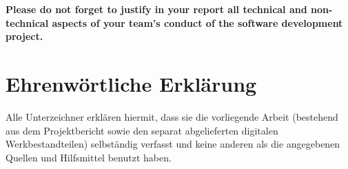 \documentclass[a4paper,11pt,twoside]{article}
\begin{document}
\textbf{Please do not forget to justify in your report all technical and non-technical aspects of your team's conduct of the software development project.}

\cleardoublepage
\pagestyle{report}
\fancyhead[RE,LO]{}

\tableofcontents

\cleardoublepage

\listoffigures
\listoftables


\cleardoublepage


\cleardoublepage


\cleardoublepage


\cleardoublepage


\cleardoublepage


\cleardoublepage


\cleardoublepage



\cleardoublepage
\fancyhead[RE,LO]{}


\cleardoublepage


\cleardoublepage
{}
{}

\section*{Ehrenwörtliche Erklärung}
\label{sec:erklaerung}
Alle Unterzeichner erklären hiermit, dass sie die vorliegende Arbeit
(bestehend aus dem Projektbericht sowie den separat abgelieferten
digitalen Werkbestandteilen) selbständig verfasst und keine anderen als
die angegebenen Quellen und Hilfsmittel benutzt haben.





\newpage


\end{document}
